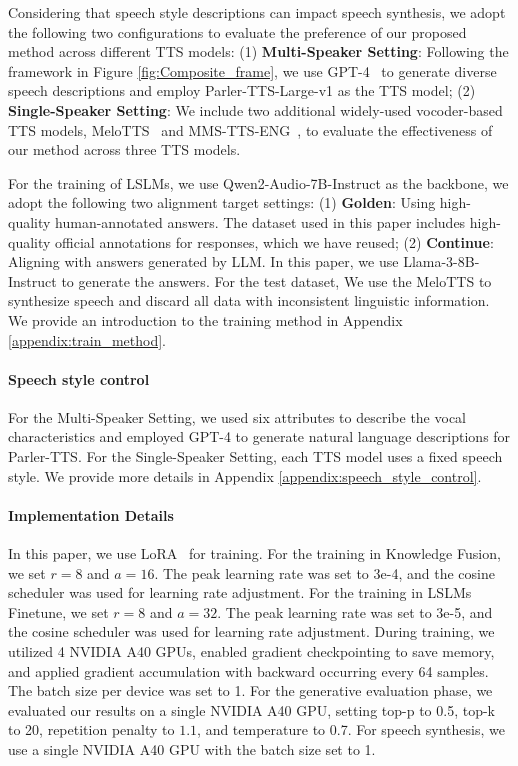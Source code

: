 \documentclass[11pt]{article}
\begin{document}
	

	Considering that speech style descriptions can impact speech synthesis, we adopt the following two configurations to evaluate the preference of our proposed method across different TTS models: (1) \textbf{Multi-Speaker Setting}: Following the framework in Figure \ref{fig:Composite_frame}, we use GPT-4~\citep{openai2024gpt4technicalreport} to generate diverse speech descriptions and employ Parler-TTS-Large-v1 as the TTS model; (2) \textbf{Single-Speaker Setting}: We include two additional widely-used vocoder-based TTS models, MeloTTS~\citep{zhao2024melo} and MMS-TTS-ENG~\citep{pratap2023mms}, to evaluate the effectiveness of our method across three TTS models. 


	For the training of LSLMs, we use Qwen2-Audio-7B-Instruct as the backbone, we adopt the following two alignment target settings: (1) \textbf{Golden}: Using high-quality human-annotated answers. The dataset used in this paper includes high-quality official annotations for responses, which we have reused; (2) \textbf{Continue}: Aligning with answers generated by LLM. In this paper, we use Llama-3-8B-Instruct to generate the answers. For the test dataset, We use the MeloTTS to synthesize speech and discard all data with inconsistent linguistic information. We provide an introduction to the training method in Appendix \ref{appendix:train_method}.


	\paragraph{Speech style control} 
	For the Multi-Speaker Setting, we used six attributes to describe the vocal characteristics and employed GPT-4 to generate natural language descriptions for Parler-TTS.  For the Single-Speaker Setting, each TTS model uses a fixed speech style. We provide more details in Appendix \ref{appendix:speech_style_control}.



	\paragraph{Implementation Details}	
	In this paper, we use LoRA~\citep{hu2021loralowrankadaptationlarge} for training. For the training in Knowledge Fusion, we set $r=8$ and $a=16$. The peak learning rate was set to 3e-4, and the cosine scheduler was used for learning rate adjustment. For the training in LSLMs Finetune, we set $r=8$ and $a=32$. The peak learning rate was set to 3e-5, and the cosine scheduler was used for learning rate adjustment. During training, we utilized 4 NVIDIA A40 GPUs, enabled gradient checkpointing to save memory, and applied gradient accumulation with backward occurring every 64 samples. The batch size per device was set to 1. 	For the generative evaluation phase, we evaluated our results on a single NVIDIA A40 GPU, setting top-p to 0.5, top-k to 20, repetition penalty to $1.1$, and temperature to 0.7. For speech synthesis, we use a single NVIDIA A40 GPU with the batch size set to 1.
		
\end{document}
